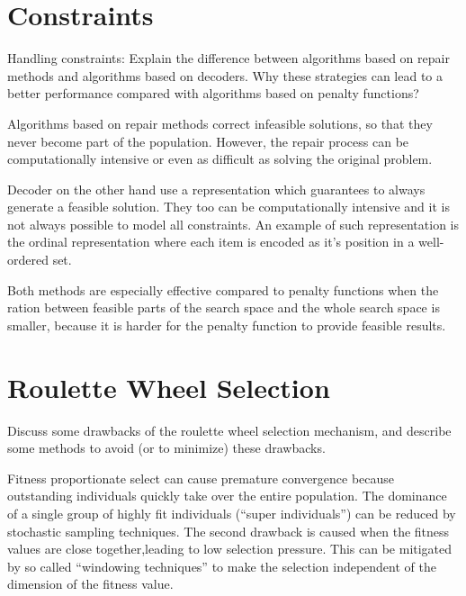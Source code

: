 \documentclass[../main.tex]{subfiles}
\begin{document}
\section{Constraints}
\begin{question}
Handling constraints: Explain the difference between algorithms based on repair methods and algorithms based on
decoders. Why these strategies can lead to a better performance compared with algorithms based on penalty functions?
\end{question}
\begin{solution}
Algorithms based on repair methods correct infeasible solutions, so that they never become part of the population.
However, the repair process can be computationally intensive or even as difficult as solving the original problem.

Decoder on the other hand use a representation which guarantees to always generate a feasible solution. They too can be
computationally intensive and it is not always possible to model all constraints. An example of such representation is the ordinal representation where each item is encoded as it's position in a well-ordered set.

Both methods are especially effective compared to penalty functions when the ration between feasible parts of the
search space and the whole search space is smaller, because it is harder for the penalty function to provide feasible
results.
\end{solution}

\section{Roulette Wheel Selection}
\begin{question}
Discuss some drawbacks of the roulette wheel selection mechanism, and describe some methods to avoid (or to minimize)
these drawbacks.
\end{question}
\begin{solution}
Fitness proportionate select can cause premature convergence because outstanding individuals quickly take over the
entire population. The dominance of a single group of highly fit individuals (``super individuals'') can be reduced by
stochastic sampling techniques. The second drawback is caused when the fitness values are close together,leading to low
selection pressure. This can be mitigated by so called ``windowing techniques'' to make the selection independent of
the dimension of the fitness value.
\end{solution}
\end{document}
